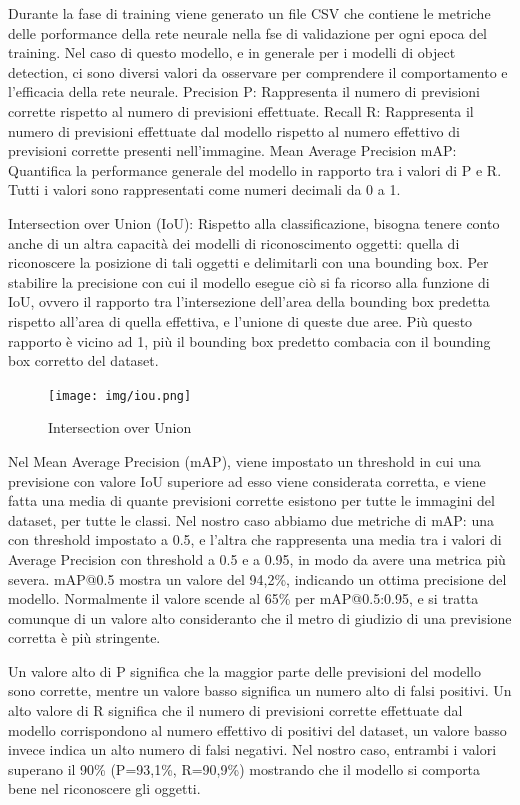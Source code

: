 \documentclass{article}
\begin{document}
  Durante la fase di training viene generato un file CSV che contiene le metriche delle porformance della rete neurale nella fse di validazione per ogni epoca del training.
  Nel caso di questo modello, e in generale per i modelli di object detection, ci sono diversi valori da osservare per comprendere il comportamento e l'efficacia della rete neurale.
  Precision P: Rappresenta il numero di previsioni corrette rispetto al numero di previsioni effettuate.
  Recall R: Rappresenta il numero di previsioni effettuate dal modello rispetto al numero effettivo di previsioni corrette presenti nell'immagine.
  Mean Average Precision mAP: Quantifica la performance generale del modello in rapporto tra i valori di P e R.
  Tutti i valori sono rappresentati come numeri decimali da 0 a 1.

  Intersection over Union (IoU): Rispetto alla classificazione, bisogna tenere conto anche di un altra capacità dei modelli di riconoscimento oggetti: quella di riconoscere la posizione di tali oggetti e delimitarli con una bounding box.
  Per stabilire la precisione con cui il modello esegue ciò si fa ricorso alla funzione di IoU, ovvero il rapporto tra l'intersezione dell'area della bounding box predetta rispetto all'area di quella effettiva, e l'unione di queste due aree.
  Più questo rapporto è vicino ad 1, più il bounding box predetto combacia con il bounding box corretto del dataset.
  

  \begin{figure}[h!]
    \centering
    \texttt{[image: img/iou.png]}
    \caption{Intersection over Union}
  \end{figure}
  
  \newpage

  Nel Mean Average Precision (mAP), viene impostato un threshold in cui una previsione con valore IoU superiore ad esso viene considerata corretta, e viene fatta una media di quante previsioni corrette esistono per tutte le immagini del dataset, per tutte le classi.
  Nel nostro caso abbiamo due metriche di mAP: una con threshold impostato a 0.5, e l'altra che rappresenta una media tra i valori di Average Precision con threshold a 0.5 e a 0.95, in modo da avere una metrica più severa.
  mAP@0.5 mostra un valore del 94,2\%, indicando un ottima precisione del modello. Normalmente il valore scende al 65\% per mAP@0.5:0.95, e si tratta comunque di un valore alto consideranto che il metro di giudizio di una previsione corretta è più stringente.

  Un valore alto di P significa che la maggior parte delle previsioni del modello sono corrette, mentre un valore basso significa un numero alto di falsi positivi.
  Un alto valore di R significa che il numero di previsioni corrette effettuate dal modello corrispondono al numero effettivo di positivi del dataset, un valore basso invece indica un alto numero di falsi negativi.
   Nel nostro caso, entrambi i valori superano il 90\% (P=93,1\%, R=90,9\%) mostrando che il modello si comporta bene nel riconoscere gli oggetti.
\end{document}
